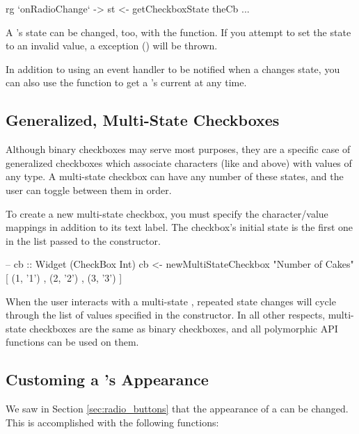 \begin{haskellcode}
 rg `onRadioChange` \theCb ->
   st <- getCheckboxState theCb
   ...
\end{haskellcode}

A 's state can be changed, too, with the
 function.  If you attempt to set the state to an
invalid value, a  exception
() will be thrown.

In addition to using an event handler to be notified when a
 changes state, you can also use the
 function to get a 's current
 at any time.

\subsection{Generalized, Multi-State Checkboxes}

Although binary checkboxes may serve most purposes, they are a
specific case of generalized checkboxes which associate characters
(like  and  above) with values of any type.  A
multi-state checkbox can have any number of these states, and the user
can toggle between them in order.

To create a new multi-state checkbox, you must specify the
character/value mappings in addition to its text label.  The
checkbox's initial state is the first one in the list passed to the
constructor.

\begin{haskellcode}
 -- cb :: Widget (CheckBox Int)
 cb <- newMultiStateCheckbox "Number of Cakes" [ (1, '1')
                                               , (2, '2')
                                               , (3, '3')
                                               ]
\end{haskellcode}

When the user interacts with a multi-state , repeated
state changes will cycle through the list of values specified in the
constructor.  In all other respects, multi-state checkboxes are the
same as binary checkboxes, and all polymorphic API functions can be
used on them.

\subsection{Customing a 's Appearance}

We saw in Section \ref{sec:radio_buttons} that the appearance of a
 can be changed.  This is accomplished with the following
functions:

